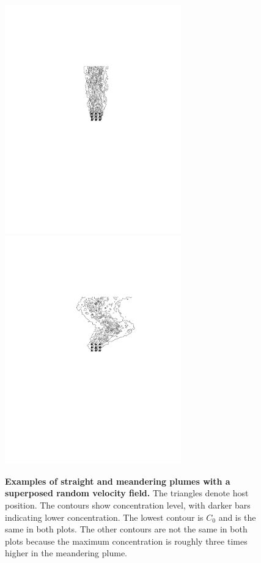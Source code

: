 \documentclass[10pt]{article}
\begin{document}
\begin{figure}[!htp]
\includegraphics[width=3in]{revised2figs/Figure4A}
\includegraphics[width=3in]{revised2figs/Figure4B}
\caption{
{\bf Examples of straight and meandering plumes with a superposed random velocity field.}  The triangles denote host position. The contours show concentration level, with darker bars indicating lower concentration. The lowest contour is $C_0$ and is the same in both plots. The other contours are not the same in both plots because the maximum concentration is roughly three times higher in the meandering plume.}
			\label{fig:Meander}
\end{figure}
\end{document}
